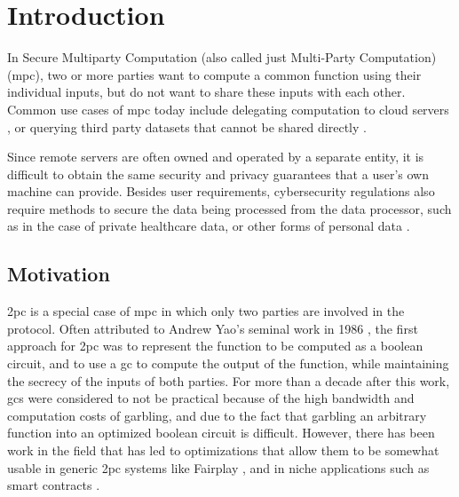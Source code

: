 \chapter{Introduction}
\label{chp:introduction} 
In Secure Multiparty Computation (also called just Multi-Party Computation) (\acrshort{mpc}), two or more parties want to compute a common function using their individual inputs, but do not want to share these inputs with each other.
Common use cases of \acrshort{mpc} today include delegating computation to cloud servers \cite{delegatedmpc}, or querying third party datasets that cannot be shared directly \cite{PJCGoogle}.
 
Since remote servers are often owned and operated by a separate entity, it is difficult to obtain the same security and privacy guarantees that a user's own machine can provide. Besides user requirements, cybersecurity regulations also require methods to secure the data being processed from the data processor, such as in the case of private healthcare data, or other forms of personal data \cite{gdpr_2016}. 

\section{Motivation}
\label{sec:motivation}

\acrfull{2pc} is a special case of \acrshort{mpc} in which only two parties are involved in the protocol. 
Often attributed to Andrew Yao's seminal work in 1986 \cite{FOCS:Yao86}, the first approach for \acrshort{2pc} was to represent the function to be computed as a boolean circuit, and to use a \acrfull{gc} to compute the output of the function, while maintaining the secrecy of the inputs of both parties. For more than a decade after this work, \acrlong{gc}s were considered to not be practical because of the high bandwidth and computation costs of garbling, and due to the fact that garbling an arbitrary function into an optimized boolean circuit is difficult. However, there has been work in the field that has led to optimizations that allow them to be somewhat usable in generic \acrshort{2pc} systems like Fairplay \cite{malkhi_fairplaysecure_2004}, and in niche applications such as smart contracts \cite{haloani_coti_nodate}. 

